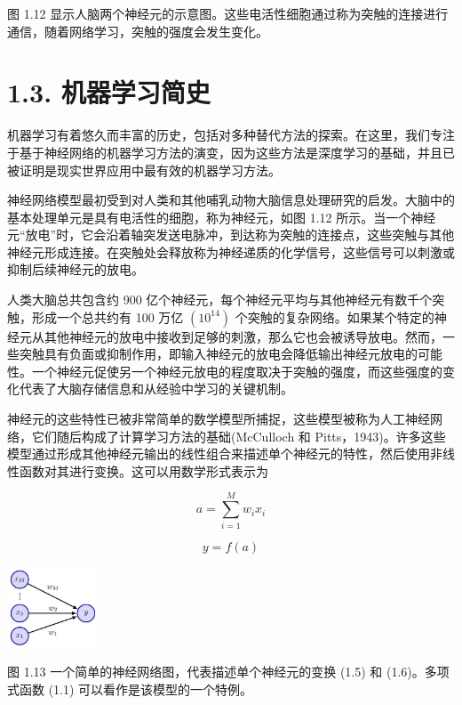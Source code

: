 \documentclass[10pt]{article}
\begin{document}
图 1.12 显示人脑两个神经元的示意图。这些电活性细胞通过称为突触的连接进行通信，随着网络学习，突触的强度会发生变化。

\section*{1.3. 机器学习简史}

机器学习有着悠久而丰富的历史，包括对多种替代方法的探索。在这里，我们专注于基于神经网络的机器学习方法的演变，因为这些方法是深度学习的基础，并且已被证明是现实世界应用中最有效的机器学习方法。

神经网络模型最初受到对人类和其他哺乳动物大脑信息处理研究的启发。大脑中的基本处理单元是具有电活性的细胞，称为神经元，如图 1.12 所示。当一个神经元“放电”时，它会沿着轴突发送电脉冲，到达称为突触的连接点，这些突触与其他神经元形成连接。在突触处会释放称为神经递质的化学信号，这些信号可以刺激或抑制后续神经元的放电。

人类大脑总共包含约 900 亿个神经元，每个神经元平均与其他神经元有数千个突触，形成一个总共约有 100 万亿 \(\left( {10}^{14}\right)\) 个突触的复杂网络。如果某个特定的神经元从其他神经元的放电中接收到足够的刺激，那么它也会被诱导放电。然而，一些突触具有负面或抑制作用，即输入神经元的放电会降低输出神经元放电的可能性。一个神经元促使另一个神经元放电的程度取决于突触的强度，而这些强度的变化代表了大脑存储信息和从经验中学习的关键机制。

神经元的这些特性已被非常简单的数学模型所捕捉，这些模型被称为人工神经网络，它们随后构成了计算学习方法的基础(McCulloch 和 Pitts，1943)。许多这些模型通过形成其他神经元输出的线性组合来描述单个神经元的特性，然后使用非线性函数对其进行变换。这可以用数学形式表示为

\[
a = \mathop{\sum }\limits_{{i = 1}}^{M}{w}_{i}{x}_{i} \tag{1.5}
\]

\[
y = f\left( a\right)  \tag{1.6}
\]

\begin{center}
\includegraphics[max width=0.2\textwidth]{images/0194e279-9b28-703a-88f4-c3ac21e2010d_36_1225_345_326_291_0.jpg}
\end{center}
\hspace*{3em} 

图 1.13 一个简单的神经网络图，代表描述单个神经元的变换 (1.5) 和 (1.6)。多项式函数 (1.1) 可以看作是该模型的一个特例。
\end{document}
